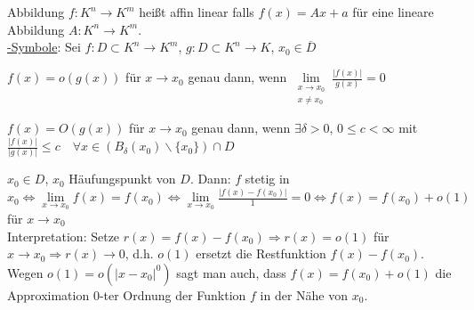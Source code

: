 \begin{ueberblick}
	
	Abbildung $f:K^n\to K^m$ heißt affin linear falls $f(x)=Ax+a$ für eine 
	lineare Abbildung $A:K^n\to K^m$. \\
	
	\underline{-Symbole}: Sei $f:D\subset K^n \to K^m$, $g:D\subset K^n\to K$, 
	$x_0\in \overline{D}$
	\begin{compactitem}
		\item $f(x)=o(g(x))$ für $x\to x_0$ genau dann, wenn $\lim\limits_{\substack{x\to x_0 \\ x\neq x_0}} \frac{|f(x)|}{g(x)}=0$
		\item $f(x)=O(g(x))$ für $x\to x_0$ genau dann, wenn $\exists\delta>0$, $0\le c<\infty$ mit 
		$\frac{|f(x)|}{|g(x)|}\le c \quad \forall x\in (B_{\delta}(x_0)\backslash \{x_0\})\cap D$
	\end{compactitem}
	\end{ueberblick}


	\begin{beispiel}[$f: D\subset K^n \to K^m$]
		$x_0\in D$, $x_0$ Häufungspunkt von $D$. Dann: $f$ stetig in $x_0 \iff \lim\limits_{x\to x_0} f(x)
		=f(x_0)\iff \lim\limits_{x\to x_0} \frac{|f(x)-f(x_0)|}{1}=0 \iff f(x)=f(x_0)+o(1)$ für $x\to x_0$ \\
		Interpretation: Setze $r(x)=f(x)-f(x_0)\Rightarrow r(x)=o(1)$ für $x\to x_0\Rightarrow r(x)\to 0$, 
		d.h. $o(1)$ ersetzt die Restfunktion $f(x)-f(x_0)$. Wegen $o(1)=o(|x-x_0|^0)$ sagt man auch, 
		dass $f(x)=f(x_0)+o(1)$ die Approximation 0-ter Ordnung der Funktion $f$ in der Nähe von $x_0$.
	\end{beispiel}

